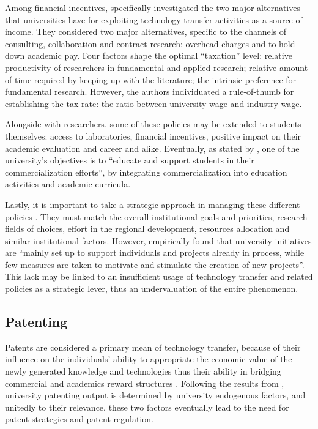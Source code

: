 Among financial incentives, \citet{Beath2000} specifically investigated the two major alternatives that universities have for exploiting technology transfer activities as a source of income. They considered two major alternatives, specific to the channels of consulting, collaboration and contract research: overhead charges and to hold down academic pay. Four factors shape the optimal \enquote{taxation} level: relative productivity of researchers in fundamental and applied research; relative amount of time required by keeping up with the literature; the intrinsic preference for fundamental research. However, the authors individuated a rule-of-thumb for establishing the tax rate: the ratio between university wage and industry wage.

Alongside with researchers, some of these policies may be extended to students themselves: access to laboratories, financial incentives, positive impact on their academic evaluation and career and alike. Eventually, as stated by \citet{Rasmussen2006}, one of the university's objectives is to \enquote{educate and support students in their commercialization efforts}, by integrating commercialization into education activities and academic curricula. 

Lastly, it is important to take a strategic approach in managing these different policies \citep{Siegel2007}. They must match the overall institutional goals and priorities, research fields of choices, effort in the regional development, resources allocation and similar institutional factors. However, \citet{Rasmussen2006} empirically found that university initiatives are \enquote{mainly set up to support individuals and projects already in process, while few measures are taken to motivate and stimulate the creation of new projects}. This lack may be linked to an insufficient usage of technology transfer and related policies as a strategic lever, thus an undervaluation of the entire phenomenon.

\subsection{Patenting}

Patents are considered a primary mean of technology transfer, because of their influence on the individuals' ability to appropriate the economic value of the newly generated knowledge and technologies \citep{Bercovitz2006} thus their ability in bridging commercial and academics reward structures \citep{OwenSmith2001}. Following the results from \citet{Tijssen2006}, university patenting output is determined by university endogenous factors, and unitedly to their relevance, these two factors eventually lead to the need for patent strategies \citep{Siegel2007} and patent regulation.

